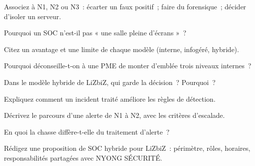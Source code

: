 \bigskip

\begin{boxexo}[title={\ding{45}\quad Exercice~2.1. Les niveaux \niveaubase}]
Associez à N1, N2 ou N3~: écarter un faux positif~; faire du forensique~;
décider d'isoler un serveur.
\end{boxexo}

\begin{boxexo}[title={\ding{45}\quad Exercice~2.2. SOC ou exploitation \niveaubase}]
Pourquoi un SOC n'est-il pas « une salle pleine d'écrans »~?
\end{boxexo}

\begin{boxexo}[title={\ding{45}\quad Exercice~2.3. Modèles \niveaubase}]
Citez un avantage et une limite de chaque modèle (interne, infogéré,
hybride).
\end{boxexo}

\begin{boxexo}[title={\ding{45}\quad Exercice~2.4. Maturité \niveaumoyen}]
Pourquoi déconseille-t-on à une PME de monter d'emblée trois niveaux
internes~?
\end{boxexo}

\begin{boxexo}[title={\ding{45}\quad Exercice~2.5. Hybride \niveaumoyen}]
Dans le modèle hybride de LiZbiZ, qui garde la décision~? Pourquoi~?
\end{boxexo}

\begin{boxexo}[title={\ding{45}\quad Exercice~2.6. Fonctions \niveaumoyen}]
Expliquez comment un incident traité améliore les règles de détection.
\end{boxexo}

\begin{boxexo}[title={\ding{45}\quad Exercice~2.7. Escalade \niveaumoyen}]
Décrivez le parcours d'une alerte de N1 à N2, avec les critères d'escalade.
\end{boxexo}

\begin{boxexo}[title={\ding{45}\quad Exercice~2.8. Chasse \niveaumoyen}]
En quoi la chasse diffère-t-elle du traitement d'alerte~?
\end{boxexo}

\begin{boxexo}[title={\ding{45}\quad Exercice~2.9. Proposition \niveauexpert}]
Rédigez une proposition de SOC hybride pour LiZbiZ~: périmètre, rôles,
horaires, responsabilités partagées avec NYONG SÉCURITÉ.
\end{boxexo}

